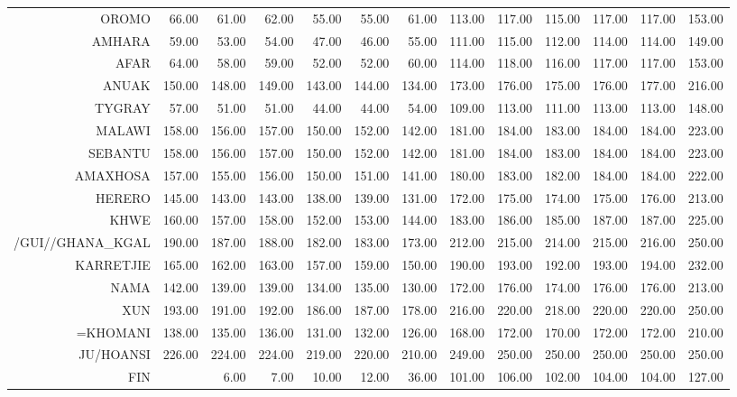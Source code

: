 \begin{longtable}{rrrrrrrrrrrrr}
  OROMO & 66.00 & 61.00 & 62.00 & 55.00 & 55.00 & 61.00 & 113.00 & 117.00 & 115.00 & 117.00 & 117.00 & 153.00 \\ 
  AMHARA & 59.00 & 53.00 & 54.00 & 47.00 & 46.00 & 55.00 & 111.00 & 115.00 & 112.00 & 114.00 & 114.00 & 149.00 \\ 
  AFAR & 64.00 & 58.00 & 59.00 & 52.00 & 52.00 & 60.00 & 114.00 & 118.00 & 116.00 & 117.00 & 117.00 & 153.00 \\ 
  ANUAK & 150.00 & 148.00 & 149.00 & 143.00 & 144.00 & 134.00 & 173.00 & 176.00 & 175.00 & 176.00 & 177.00 & 216.00 \\ 
  TYGRAY & 57.00 & 51.00 & 51.00 & 44.00 & 44.00 & 54.00 & 109.00 & 113.00 & 111.00 & 113.00 & 113.00 & 148.00 \\ 
   \hline 
MALAWI & 158.00 & 156.00 & 157.00 & 150.00 & 152.00 & 142.00 & 181.00 & 184.00 & 183.00 & 184.00 & 184.00 & 223.00 \\ 
  SEBANTU & 158.00 & 156.00 & 157.00 & 150.00 & 152.00 & 142.00 & 181.00 & 184.00 & 183.00 & 184.00 & 184.00 & 223.00 \\ 
  AMAXHOSA & 157.00 & 155.00 & 156.00 & 150.00 & 151.00 & 141.00 & 180.00 & 183.00 & 182.00 & 184.00 & 184.00 & 222.00 \\ 
  HERERO & 145.00 & 143.00 & 143.00 & 138.00 & 139.00 & 131.00 & 172.00 & 175.00 & 174.00 & 175.00 & 176.00 & 213.00 \\ 
   \hline 
KHWE & 160.00 & 157.00 & 158.00 & 152.00 & 153.00 & 144.00 & 183.00 & 186.00 & 185.00 & 187.00 & 187.00 & 225.00 \\ 
  /GUI//GHANA\_KGAL & 190.00 & 187.00 & 188.00 & 182.00 & 183.00 & 173.00 & 212.00 & 215.00 & 214.00 & 215.00 & 216.00 & 250.00 \\ 
  KARRETJIE & 165.00 & 162.00 & 163.00 & 157.00 & 159.00 & 150.00 & 190.00 & 193.00 & 192.00 & 193.00 & 194.00 & 232.00 \\ 
  NAMA & 142.00 & 139.00 & 139.00 & 134.00 & 135.00 & 130.00 & 172.00 & 176.00 & 174.00 & 176.00 & 176.00 & 213.00 \\ 
  XUN & 193.00 & 191.00 & 192.00 & 186.00 & 187.00 & 178.00 & 216.00 & 220.00 & 218.00 & 220.00 & 220.00 & 250.00 \\ 
  =KHOMANI & 138.00 & 135.00 & 136.00 & 131.00 & 132.00 & 126.00 & 168.00 & 172.00 & 170.00 & 172.00 & 172.00 & 210.00 \\ 
  JU/HOANSI & 226.00 & 224.00 & 224.00 & 219.00 & 220.00 & 210.00 & 249.00 & 250.00 & 250.00 & 250.00 & 250.00 & 250.00 \\ 
   \hline 
FIN &  & 6.00 & 7.00 & 10.00 & 12.00 & 36.00 & 101.00 & 106.00 & 102.00 & 104.00 & 104.00 & 127.00 \\ 

\end{longtable}
